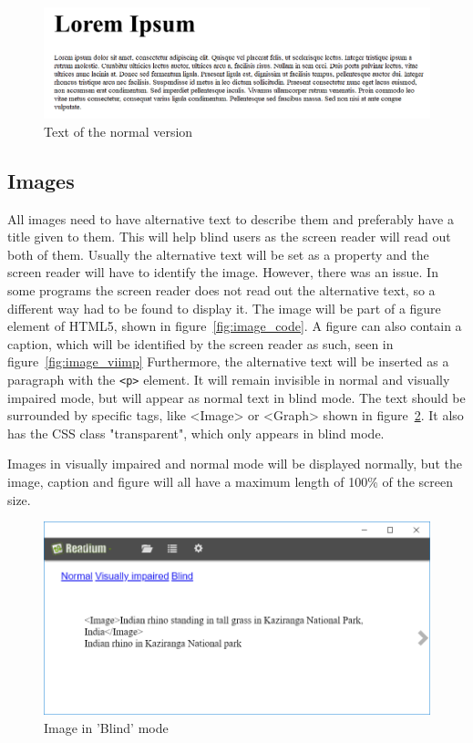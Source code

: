 \begin{figure}
	\includegraphics[width=\linewidth]{figures/Ntext.png}	
	\caption{Text of the normal version}
	\label{fig:nText}
\end{figure}

\subsection{Images}

All images need to have alternative text to describe them and preferably have a title given to them. This will help blind users as the screen reader will read out both of them. Usually the alternative text will be set as a property and the screen reader will have to identify the image. However, there was an issue. In some programs the screen reader does not read out the alternative text, so a different way had to be found to display it. The image will be part of a figure element of HTML5, shown in figure~\ref{fig:image_code}. A figure can also contain a caption, which will be identified by the screen reader as such, seen in  figure~\ref{fig:image_viimp} Furthermore, the alternative text will be inserted as a paragraph with the \lstinline|<p>| element. It will remain invisible in normal and visually impaired mode, but will appear as normal text in blind mode. The text should be surrounded by specific tags, like <Image> or <Graph> shown in figure~\ref{fig:image_blind}. It also has the CSS class "transparent", which only appears in blind mode.

Images in visually impaired and normal mode will be displayed normally, but the image, caption and figure will all have a maximum length of 100\% of the screen size.

\begin{figure}[H]
	\centering
	\includegraphics[width=\linewidth]{figures/ImageBl.PNG}
	\caption{Image in 'Blind' mode}
	\label{fig:image_blind}
\end{figure}

